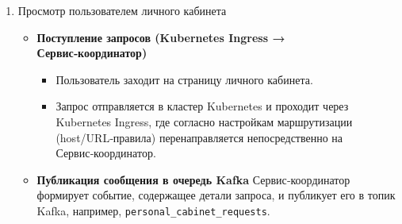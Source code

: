 \begin{enumerate}
\begin{itemize}
        \item \textbf{Пост-обработка}
        \begin{itemize}
            \item Сервис лояльности также получает событие ReservationConfirmed (или отдельное событие PointsAwarded, инициированное после бронирования) для начисления бонусных миль/баллов пользователю.
            \item Сервис статистики подписан на ВСЕ ключевые топики (например, booking\_requests, payment\_approved, payment\_failed, reservation\_confirmed, aviasales\_updates):
            \begin{enumerate}
                \item Он собирает информацию о количестве успешных и неудачных бронирований, времени отклика на каждое событие, динамике цен и других метриках.
                \item Такая сборка статистики обеспечивает аналитическую базу для оптимизации процессов и оценки качества сервиса.
            \end{enumerate}
        \end{itemize}

    \end{itemize}

    \item Просмотр пользователем личного кабинета
    \begin{itemize}
        \item \textbf{Поступление запросов (Kubernetes Ingress → Сервис‑координатор)}
        \begin{itemize}
            \item Пользователь заходит на страницу личного кабинета.
            \item Запрос отправляется в кластер Kubernetes и проходит через Kubernetes Ingress, где согласно настройкам маршрутизации (host/URL‑правила) перенаправляется непосредственно на Сервис‑координатор.
        \end{itemize}

        \item \textbf{Публикация сообщения в очередь Kafka}
        Сервис‑координатор формирует событие, содержащее детали запроса, и публикует его в топик Kafka, например, \texttt{personal\_cabinet\_requests}.


\end{itemize}
\end{enumerate}
